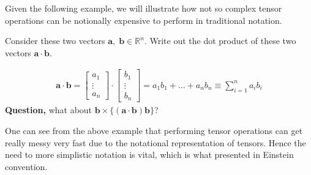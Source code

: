 \documentclass[../main.tex]{subfiles}
\begin{document}
	
	\par Given the following example, we will illustrate how not so complex tensor operations can be notionally expensive to perform in traditional notation.
	
	\begin{example}
		Consider these two vectors $\mathbf{a}, \; \mathbf{b} \in \mathbb{R}^n$. Write out the dot product of these two vectors $\mathbf{a} \cdot \mathbf{b}$.
	\end{example}
	\begin{solution}
		\begin{align*}
			\mathbf{a} \cdot \mathbf{b} = 
			\begin{bmatrix}
				a_1 \\
				\vdots \\
				a_n
			\end{bmatrix}
			\cdot
			\begin{bmatrix}
				b_1 \\
				\vdots \\
				b_n
			\end{bmatrix}
			=
			a_1 b_1 + \hdots + a_n b_n
			\equiv
			\sum_{i=1}^n a_i b_i
		\end{align*}
		\textbf{Question,} what about $\mathbf{b} \times \lbrace(\mathbf{a} \cdot \mathbf{b})\mathbf{b}\rbrace$?
	\end{solution}
		
	\par One can see from the above example that performing tensor operations can get really messy very fast due to the notational representation of tensors. Hence the need to more simplistic notation is vital, which is what presented in Einstein convention.
	
\end{document}
